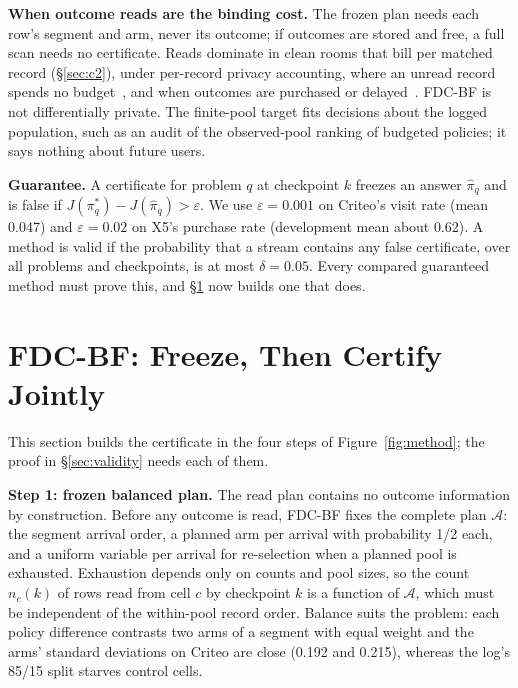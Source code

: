 \documentclass[sigconf,anonymous,review]{acmart}
\newcommand{\cA}{\mathcal{A}}
\newcommand{\eps}{\varepsilon}
\begin{document}
\textbf{When outcome reads are the binding cost.} The frozen plan needs each row's segment and arm, never its outcome; if outcomes are stored and free, a full scan needs no certificate. Reads dominate in clean rooms that bill per matched record (\S\ref{sec:c2}), under per-record privacy accounting, where an unread record spends no budget~\citep{feldman2021individual}, and when outcomes are purchased or delayed~\citep{chapelle2014modeling}. FDC-BF is not differentially private. The finite-pool target fits decisions about the logged population, such as an audit of the observed-pool ranking of budgeted policies; it says nothing about future users.

\textbf{Guarantee.} A certificate for problem $q$ at checkpoint $k$ freezes an answer $\hat\pi_q$ and is false if $J(\pi^*_q) - J(\hat\pi_q) > \eps$. We use $\eps = 0.001$ on Criteo's visit rate (mean 0.047) and $\eps = 0.02$ on X5's purchase rate (development mean about 0.62). A method is valid if the probability that a stream contains any false certificate, over all problems and checkpoints, is at most $\delta = 0.05$. Every compared guaranteed method must prove this, and \S\ref{sec:method} now builds one that does.

\section{FDC-BF: Freeze, Then Certify Jointly}\label{sec:method}

This section builds the certificate in the four steps of Figure~\ref{fig:method}; the proof in \S\ref{sec:validity} needs each of them.

\textbf{Step 1: frozen balanced plan.} The read plan contains no outcome information by construction. Before any outcome is read, FDC-BF fixes the complete plan $\cA$: the segment arrival order, a planned arm per arrival with probability 1/2 each, and a uniform variable per arrival for re-selection when a planned pool is exhausted. Exhaustion depends only on counts and pool sizes, so the count $n_c(k)$ of rows read from cell $c$ by checkpoint $k$ is a function of $\cA$, which must be independent of the within-pool record order. Balance suits the problem: each policy difference contrasts two arms of a segment with equal weight and the arms' standard deviations on Criteo are close (0.192 and 0.215), whereas the log's 85/15 split starves control cells.
\end{document}
